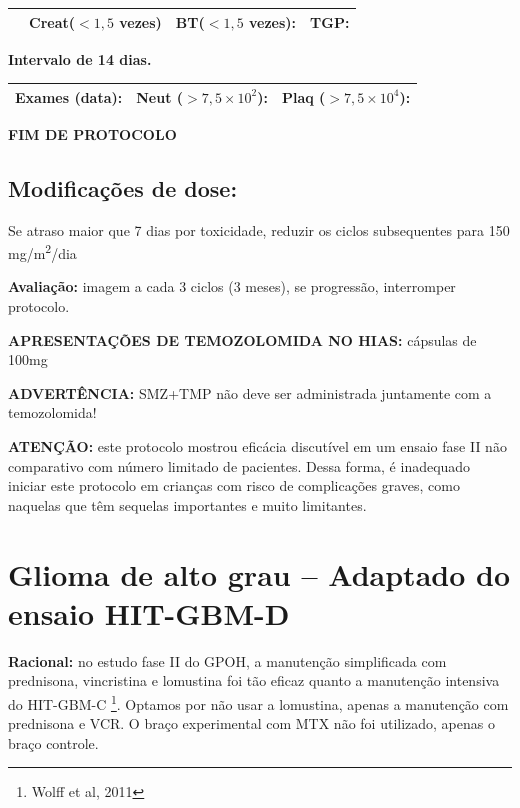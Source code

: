 \documentclass[11pt,a4paper,oldfontcommands]{memoir}
\begin{document}
\begin{center}
\begin{table}[H]
\begin{tabular}{p{1cm}p{5cm}|p{1cm}|p{4.5cm}|p{2cm}}
    \cline{2-5}
    \multicolumn{1}{c|}{\multirow{2}{*}{{}}}&\multicolumn{2}{l|}{Creat(\(<1,5\) vezes)}&{BT(\(<1,5\) vezes):}&{TGP:}
    \\
    \hline
\end{tabular}
\end{table}
\textbf{Intervalo de 14 dias.}
\begin{table}[H]
\begin{tabular}{p{5cm}|p{5cm}|p{4.7cm}}
    \hline
    \textbf{Exames (data):}&{Neut (\(>7,5\times10^2\)):}&{Plaq (\(>7,5\times10^4\)):}
    \\
    \hline
\end{tabular}
\end{table}

\textbf{FIM DE PROTOCOLO}

\end{center}
\subsection{Modificações de dose:}
Se atraso maior que 7 dias por toxicidade, reduzir os ciclos subsequentes para 150 mg/m\textsuperscript{2}/dia

\textbf{Avaliação:} imagem a cada 3 ciclos (3 meses), se progressão, interromper protocolo.

\textbf{APRESENTAÇÕES DE TEMOZOLOMIDA NO HIAS:} cápsulas de 100mg

\textbf{ADVERTÊNCIA:} SMZ+TMP não deve ser administrada juntamente com a temozolomida!

\textbf{ATENÇÃO:} este protocolo mostrou eficácia discutível em um ensaio fase II não comparativo com número limitado de pacientes. Dessa forma, é inadequado iniciar este protocolo em crianças com risco de complicações graves, como naquelas que têm sequelas importantes e muito limitantes.
\cleardoublepage
\section{Glioma de alto grau -- Adaptado do ensaio HIT-GBM-D}
{\let\thefootnote\relax{}}

\textbf{Racional:} no estudo fase II do GPOH, a manutenção simplificada com prednisona, vincristina e lomustina foi tão eficaz quanto a manutenção intensiva do HIT-GBM-C \footnote{Wolff et al, 2011}. Optamos por não usar a lomustina, apenas a manutenção com prednisona e VCR. O braço experimental com MTX não foi utilizado, apenas o braço controle.
\end{document}
